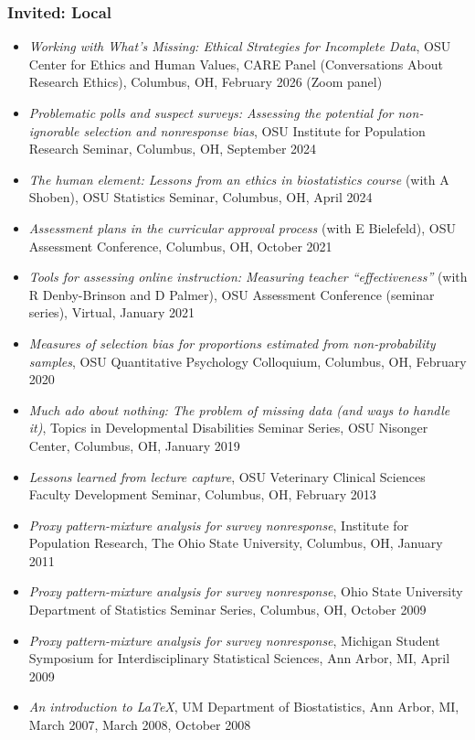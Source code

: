 \documentclass[
  english,
  letterpaper,
  DIV=11,
  numbers=noendperiod]{scrartcl}
\providecommand{\tightlist}{%
  \setlength{\itemsep}{0pt}\setlength{\parskip}{0pt}}
\begin{document}
\subsubsection{Invited: Local}\label{invited-local}

\begin{itemize}
\tightlist
\item
  \emph{Working with What's Missing: Ethical Strategies for Incomplete
  Data}, OSU Center for Ethics and Human Values, CARE Panel
  (Conversations About Research Ethics), Columbus, OH, February 2026
  (Zoom panel)
\item
  \emph{Problematic polls and suspect surveys: Assessing the potential
  for non-ignorable selection and nonresponse bias}, OSU Institute for
  Population Research Seminar, Columbus, OH, September 2024
\item
  \emph{The human element: Lessons from an ethics in biostatistics
  course} (with A Shoben), OSU Statistics Seminar, Columbus, OH, April
  2024
\item
  \emph{Assessment plans in the curricular approval process} (with E
  Bielefeld), OSU Assessment Conference, Columbus, OH, October 2021
\item
  \emph{Tools for assessing online instruction: Measuring teacher
  ``effectiveness''} (with R Denby-Brinson and D Palmer), OSU Assessment
  Conference (seminar series), Virtual, January 2021
\item
  \emph{Measures of selection bias for proportions estimated from
  non-probability samples}, OSU Quantitative Psychology Colloquium,
  Columbus, OH, February 2020
\item
  \emph{Much ado about nothing: The problem of missing data (and ways to
  handle it)}, Topics in Developmental Disabilities Seminar Series, OSU
  Nisonger Center, Columbus, OH, January 2019
\item
  \emph{Lessons learned from lecture capture}, OSU Veterinary Clinical
  Sciences Faculty Development Seminar, Columbus, OH, February 2013
\item
  \emph{Proxy pattern-mixture analysis for survey nonresponse},
  Institute for Population Research, The Ohio State University,
  Columbus, OH, January 2011
\item
  \emph{Proxy pattern-mixture analysis for survey nonresponse}, Ohio
  State University Department of Statistics Seminar Series, Columbus,
  OH, October 2009
\item
  \emph{Proxy pattern-mixture analysis for survey nonresponse}, Michigan
  Student Symposium for Interdisciplinary Statistical Sciences, Ann
  Arbor, MI, April 2009
\item
  \emph{An introduction to LaTeX}, UM Department of Biostatistics, Ann
  Arbor, MI, March 2007, March 2008, October 2008
\end{itemize}
\end{document}
